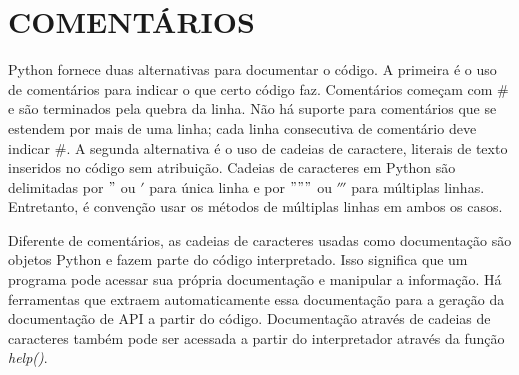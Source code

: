 \section{COMENTÁRIOS}
Python fornece duas alternativas para documentar o código.
A primeira é o uso de comentários para indicar o que certo código faz.
Comentários começam com \# e são terminados pela quebra da linha.
Não há suporte para comentários que se estendem por mais de uma linha; cada linha consecutiva de comentário deve indicar \#.
A segunda alternativa é o uso de cadeias de caractere, literais de texto inseridos no código sem atribuição.
Cadeias de caracteres em Python são delimitadas por $"$ ou $'$ para única linha e por $"""$ ou $'''$ para múltiplas linhas.
Entretanto, é convenção usar os métodos de múltiplas linhas em ambos os casos.

Diferente de comentários, as cadeias de caracteres usadas como documentação são objetos Python e fazem parte do código interpretado.
Isso significa que um programa pode acessar sua própria documentação e manipular a informação.
Há ferramentas que extraem automaticamente essa documentação para a geração da documentação de API a partir do código.
Documentação através de cadeias de caracteres também pode ser acessada a partir do interpretador através da função \textit{help()}.
